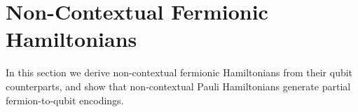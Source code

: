 \documentclass[%
 aip,
 amsmath,amssymb,
 reprint,%
]{revtex4-1}
\begin{document}

\section{Non-Contextual Fermionic Hamiltonians}
\label{sec:fermionic-encodings}
\indent In this section we derive non-contextual fermionic Hamiltonians from their qubit counterparts, and show that non-contextual Pauli Hamiltonians generate partial fermion-to-qubit encodings. 
\end{document}
